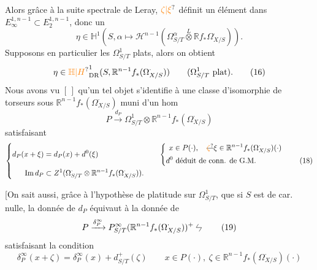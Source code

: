 Alors grâce à la suite spectrale de Leray, $\unsure{\zeta|\xi}$ définit un élément dans $E_\infty^{1,n-1}\subset E_2^{1,n-1}$, donc un
\[
 \eta\in\mathbb H^1(S,\alpha\longmapsto\mathscr H^{n-1}
 (\Omega^\alpha_{S/T}\overset{L}{\otimes}\mathbb R f_*\Omega^\cdot_{X/S})).
 \tag*{(15)}
\]
Supposons en particulier les $\Omega^1_{S/T}$ plats,  alors on obtient
\[
 \eta\in {\unsure{\mathbb H|H}}^1_{\mathrm{DR}}(S,\mathbb R^{n-1}f_*(\Omega^\cdot_{X/S}))
 \qquad(\Omega^1_{S/T}\text{ plat}).
 \tag*{(16)}
\]
Nous avons vu $[\,]$ qu'un tel objet s'identifie à une classe d'isomorphie de torseurs  sous $\mathbb R^{n-1}f_*(\Omega^\cdot_{X/S})$ muni d'un hom
\[
 P\xrightarrow{d_P}\Omega^1_{S/T}\otimes\mathbb R^{n-1}f_*(\Omega^\cdot_{X/S})
 \tag*{(17)}
\]
satisfaisant
\[
 \left\{\begin{aligned}
 d_P(x+\xi)&=d_P(x)+d^0(\xi)
 &\quad&\left\{\begin{aligned}
 x&\in P(\cdot),\quad \deleted{\unsure{\zeta}}\xi\in\mathbb R^{n-1}f_*(\Omega^\cdot_{X/S})(\cdot)\\
 d^0&\text{ déduit de conn. de G.M.}
 \end{aligned}\right.\\
 \operatorname{Im}d_P&\subset Z^1(\Omega^\cdot_{S/T}\otimes\mathbb R^{n-1}f_*(\Omega^\cdot_{X/S})).
 \end{aligned}\right.
 \tag*{(18)}
\]

[On sait aussi, grâce à l'hypothèse de platitude sur $\Omega^1_{S/T}$, que si $S$ est de car. nulle, la donnée de $d_P$ équivaut à la donnée de
\[
 P\xrightarrow{\delta_P^\infty}P_{S/T}^\infty(\mathbb R^{n-1}f_*(\Omega^\cdot_{X/S}))^+
 \mathrel{\vcenter{\hbox{\tikz{\draw (.09,.14)--(0,0)--(.22,0)--(.12,-.16);}}}}
 \tag*{(19)}
\]
satisfaisant la condition
\[
 \delta_P^\infty(x+\zeta)=\delta_P^\infty(x)+d_{S/T}^+(\zeta)
 \qquad x\in P(\cdot),\ \zeta\in\mathbb R^{n-1}f_*(\Omega^\cdot_{X/S})(\cdot)
 \tag*{(20)}
\]

